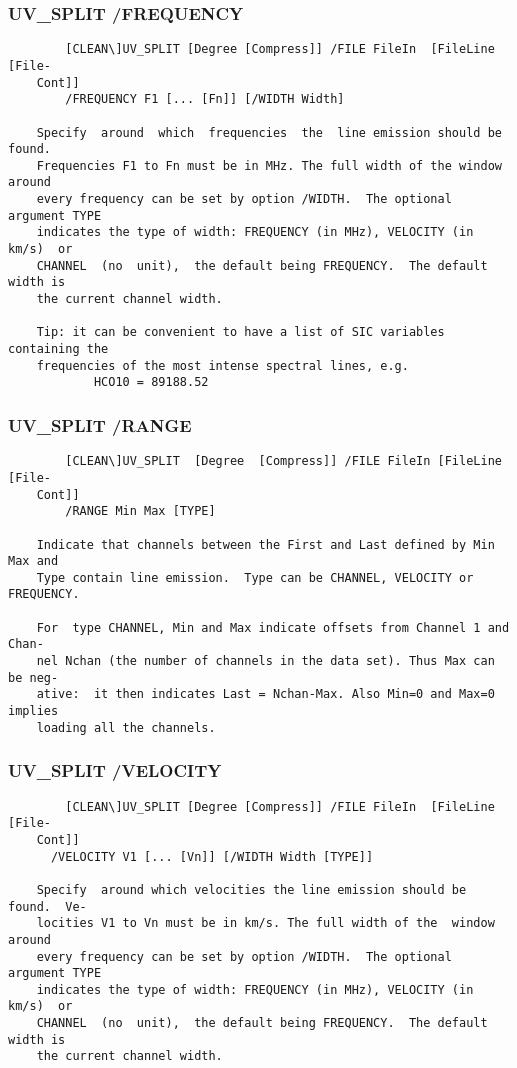 \subsubsection{UV\_SPLIT /FREQUENCY}
\begin{verbatim}
        [CLEAN\]UV_SPLIT [Degree [Compress]] /FILE FileIn  [FileLine  [File-
    Cont]]
        /FREQUENCY F1 [... [Fn]] [/WIDTH Width]

    Specify  around  which  frequencies  the  line emission should be found.
    Frequencies F1 to Fn must be in MHz. The full width of the window around
    every frequency can be set by option /WIDTH.  The optional argument TYPE
    indicates the type of width: FREQUENCY (in MHz), VELOCITY (in  km/s)  or
    CHANNEL  (no  unit),  the default being FREQUENCY.  The default width is
    the current channel width.

    Tip: it can be convenient to have a list of SIC variables containing the
    frequencies of the most intense spectral lines, e.g.
            HCO10 = 89188.52

\end{verbatim}
\subsubsection{UV\_SPLIT /RANGE}
\begin{verbatim}
        [CLEAN\]UV_SPLIT  [Degree  [Compress]] /FILE FileIn [FileLine [File-
    Cont]]
        /RANGE Min Max [TYPE]

    Indicate that channels between the First and Last defined by Min Max and
    Type contain line emission.  Type can be CHANNEL, VELOCITY or FREQUENCY.

    For  type CHANNEL, Min and Max indicate offsets from Channel 1 and Chan-
    nel Nchan (the number of channels in the data set). Thus Max can be neg-
    ative:  it then indicates Last = Nchan-Max. Also Min=0 and Max=0 implies
    loading all the channels.

\end{verbatim}
\subsubsection{UV\_SPLIT /VELOCITY}
\begin{verbatim}
        [CLEAN\]UV_SPLIT [Degree [Compress]] /FILE FileIn  [FileLine  [File-
    Cont]]
      /VELOCITY V1 [... [Vn]] [/WIDTH Width [TYPE]]

    Specify  around which velocities the line emission should be found.  Ve-
    locities V1 to Vn must be in km/s. The full width of the  window  around
    every frequency can be set by option /WIDTH.  The optional argument TYPE
    indicates the type of width: FREQUENCY (in MHz), VELOCITY (in  km/s)  or
    CHANNEL  (no  unit),  the default being FREQUENCY.  The default width is
    the current channel width.

\end{verbatim}
